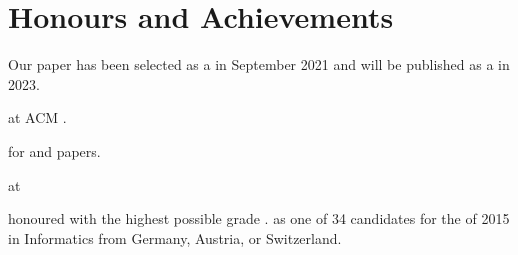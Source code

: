 \section{Honours and Achievements}
\begin{cvitemize}
    \item Our  paper has been selected as a  in September 2021 and will be published as a  in 2023.
    \item {} at ACM .
    \item {} for  and  papers.
    \item {} at
        \begin{inlineItemize}
        \item {}
        \item {}
        \end{inlineItemize}
    \item {} honoured with the highest possible grade .
           as one of 34 candidates for the  of 2015 in Informatics from Germany, Austria, or Switzerland.
\end{cvitemize}